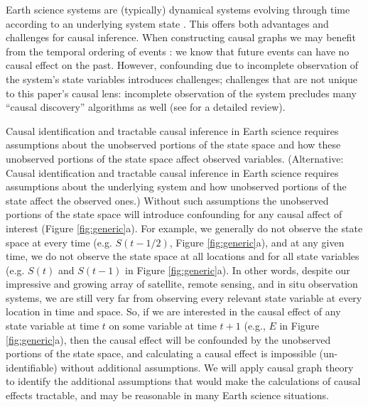 \documentclass[12pt]{article}
\begin{document}
Earth science systems are (typically) dynamical systems evolving
through time according to an underlying system state
\citep{lorenz-1963,lorenz1996predictability,majda-state}. This offers
both advantages and challenges for causal inference. When constructing
causal graphs we may benefit from the temporal ordering of events
\citep{runge2019inferring}: we know that future events can have no
causal effect on the past. However, confounding due to incomplete
observation of the system's state variables introduces challenges;
challenges that are not unique to this paper's causal lens: incomplete
observation of the system precludes many ``causal discovery''
algorithms as well (see \citet{runge2019inferring} for a detailed
review).

Causal identification and tractable causal inference in Earth science
requires assumptions about the unobserved portions of the state space
and how these unobserved portions of the state space affect observed
variables. (Alternative: Causal identification and tractable causal
inference in Earth science requires assumptions about the underlying
system and how unobserved portions of the state affect the observed
ones.) Without such assumptions the unobserved portions of the state
space will introduce confounding for any causal affect of interest
(Figure \ref{fig:generic}a). For example, we generally do not observe
the state space at every time (e.g. $S(t-1/2)$, Figure
\ref{fig:generic}a), and at any given time, we do not observe the
state space at all locations and for all state variables (e.g. $S(t)$
and $S(t-1)$ in Figure \ref{fig:generic}a). In other words, despite
our impressive and growing array of satellite, remote sensing, and in
situ observation systems, we are still very far from observing every
relevant state variable at every location in time and space.  So, if
we are interested in the causal effect of any state variable at time
$t$ on some variable at time $t+1$ (e.g., $E$ in Figure
\ref{fig:generic}a), then the causal effect will be confounded by the
unobserved portions of the state space, and calculating a causal
effect is impossible (un-identifiable) without additional
assumptions. We will apply causal graph theory to identify the
additional assumptions that would make the calculations of causal
effects tractable, and may be reasonable in many Earth science
situations.
\end{document}
